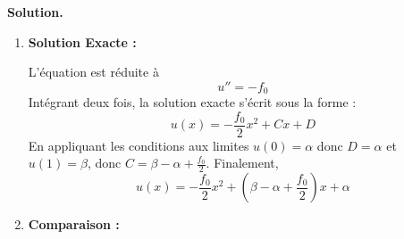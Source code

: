 \documentclass[11pt,a4paper]{report}
\newenvironment{solution}
{
    \vspace{0.5em}
    \begin{mdframed}[backgroundcolor=ThemeLight,leftmargin=0,rightmargin=0,skipabove=0.2em,skipbelow=0.2em]
    \textbf{Solution.}\\[0.5em]
}
{
    \end{mdframed}
    \vspace{0.5em}
}
\begin{document}
\begin{enumerate}[itemsep=0.5em]
{\begin{solution}
\begin{enumerate}
        \[
        \left\{
        \begin{array}{cccccc}
             \frac{p_0}{h}\Big(- \alpha & +  2 \alpha_1 &- \alpha_2 & & \Big)  &=  f_0 h \\
             \frac{p_0}{h}\Big( & - \alpha_1 &+  2 \alpha_2& - \alpha_3 &\Big)  &=  f_0 h \\
             \frac{p_0}{h}\Big(  & & - \alpha_2 &+  2 \alpha_3 &- \beta\Big)  &=  f_0 h \\
        \end{array}
        \right.
        \]
        La quantité $f_0 h^2/p_O$ apparaîtra souvent, nous la notons $\lambda$ dans la suite. Le système se réécrit:
        \[
            \left\{
                \begin{array}{cccccc}
                     - \alpha &+ 2 \alpha_1 &- \alpha_2 & & &=  \lambda \\
                     & - \alpha_1 &+ 2 \alpha_2 &- \alpha_3  & &=  \lambda \\
                     & & - \alpha_2 &+ 2 \alpha_3 &- \beta &= \lambda \\
                \end{array}
                \right.
        \]
         Pour obtenir $\alpha_3$, nous effectuons $L_1+2L_2+3L_3$ et nous avons
         \[
         4 \alpha_3 = 6 \lambda + \alpha + 3 \beta\,.
         \]
         Ainsi, 
         \[
         \alpha_3 = \frac{3}{2}\lambda + \frac{\alpha +3\beta}{4}\,.
         \]

         Il suffit alors de réinjecter dans $L_3$ pour obtenir $\alpha_2$ 
         \[
         \alpha_2 = 2\lambda + \frac{\alpha + \beta}{2}
         \]
         et de même pour $\alpha_1$
         \[
         \alpha_1 = \frac{3}{2}\lambda + \frac{3\alpha + \beta}{4}\,.
         \]
        
        \item \textbf{Solution Exacte :}
        
        L'équation est réduite à 
        \[
        u'' = - f_0
        \]
        Intégrant deux fois, la solution exacte s'écrit sous la forme :
        \[
        u(x) = -\frac{f_0}{2}x^2 + Cx + D
        \]
        En appliquant les conditions aux limites \( u(0) = \alpha \) donc $D=\alpha$ et \( u(1) = \beta \), donc $C= \beta-\alpha+\frac{f_0}{2}.$
        Finalement, 
        \[
        u(x) = -\frac{f_0}{2}x^2 + \left(\beta - \alpha + \frac{f_0}{2}\right)x + \alpha
        \]

        \item \textbf{Comparaison :}


\end{enumerate}
\end{solution}}
\end{enumerate}
\end{document}
